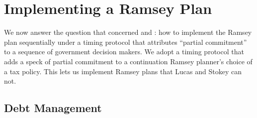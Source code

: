 \documentclass[12pt]{article}
\newcommand{\NW}[1]{{\textcolor{blue}{#1}}}
\newcommand{\TS}[1]{{\textcolor{magenta}{#1}}}
\begin{document}
{\section{Implementing a Ramsey Plan}\label{sec:implement}
We now  answer  the question that concerned \cite{LucasStokey1983} and \cite*{debortoli2021optimal}: how to implement the Ramsey plan sequentially under a timing protocol
that attributes ``partial commitment'' to a sequence of government decision makers.
We adopt a timing protocol that    adds a speck of  partial commitment to a continuation Ramsey planner's choice of a tax policy.
This lets us implement  Ramsey plans
that Lucas and Stokey can  not.%

\subsection{Debt Management}


}
\end{document}
